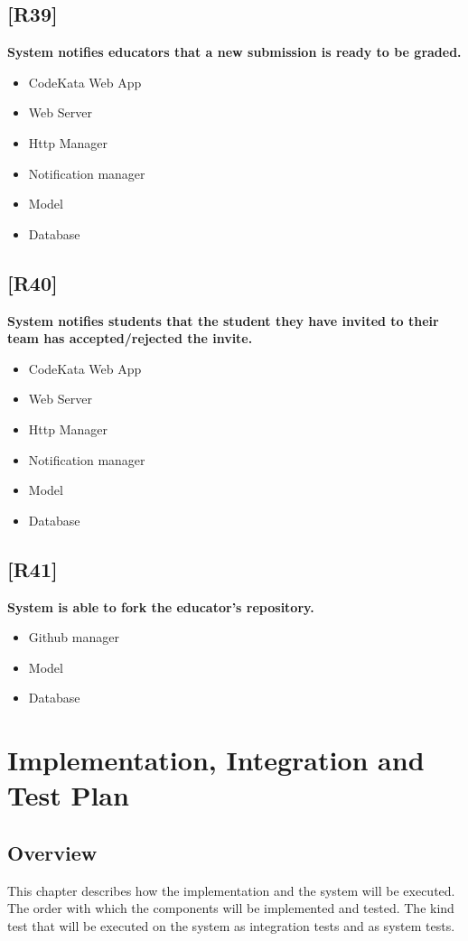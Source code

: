 \documentclass{article}
\begin{document}
\subsection{[R39]}
\textbf{ System notifies educators that a new submission is ready to be graded.}
\begin{itemize}
\item CodeKata Web App
\item Web Server
\item Http Manager
\item Notification manager
\item Model
\item Database
\end{itemize}
\subsection{[R40]}
\textbf{ System notifies students that the student they have invited to their team has accepted/rejected the invite.}
\begin{itemize}
\item CodeKata Web App
\item Web Server
\item Http Manager
\item Notification manager
\item Model
\item Database
\end{itemize}
\subsection{[R41]}
\textbf{ System is able to fork the educator’s repository.}
\begin{itemize}
\item Github manager
\item Model
\item Database
\end{itemize}

\newpage
\section{Implementation, Integration and Test Plan}
\subsection{Overview}
This chapter describes how the implementation and the system will be executed. The order with which the components will be implemented and tested. The kind test that will be executed on the system as integration tests and as system tests.
\end{document}
